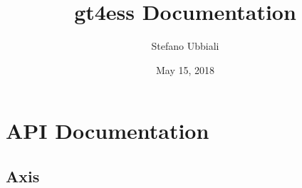 \documentclass[letterpaper,10pt,english]{sphinxmanual}
\title{gt4ess Documentation}
\date{May 15, 2018}
\author{Stefano Ubbiali}
\begin{document}
\maketitle
\sphinxtableofcontents
{}\label{\detokenize{index::doc}}



\chapter{API Documentation}
\label{\detokenize{api::doc}}\label{\detokenize{api:api-documentation}}\label{\detokenize{api:welcome-to-gt4ess-s-documentation}}

\section{Axis}
\label{\detokenize{api:axis}}
\end{document}
